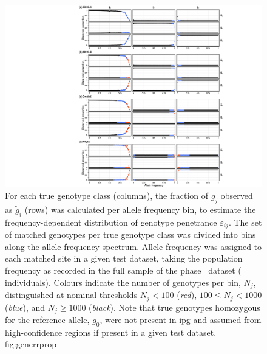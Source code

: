 

\begin{figure}[!htbp]
\includegraphics[width=\textwidth]{./img/ch4/generrprop}
%
{For each true genotype class (columns), the fraction of $g_j$ observed as $\tilde{g}_i$ (rows) was calculated per allele frequency bin, to estimate the frequency-dependent distribution of genotype penetrance $\varepsilon_{ij}$.
The set of matched genotypes per true genotype class was divided into  bins along the allele frequency spectrum.
Allele frequency was assigned to each matched site in a given test dataset, taking the population frequency as recorded in the full sample of the  phase~ dataset ( individuals).
Colours indicate the number of genotypes per bin, $N_{j}$, distinguished at nominal thresholds ${N_j < 100}$ (\emph{red}), ${100 \leq N_j < 1000}$ (\emph{blue}), and ${N_j \geq 1000}$ (\emph{black}).
Note that true genotypes homozygous for the reference allele, $g_0$, were not present in \gls{ipg} and assumed from high-confidence regions if present in a given test dataset.}%
{fig:generrprop}
\end{figure}

